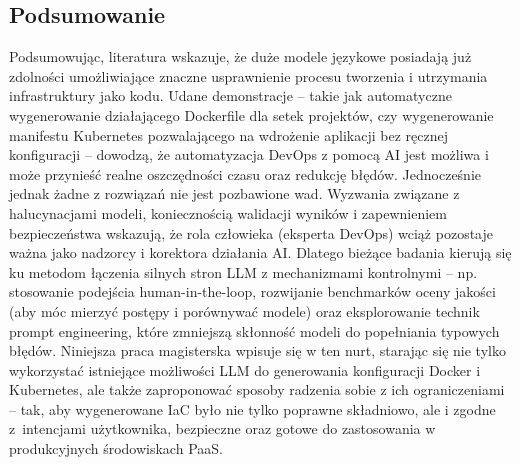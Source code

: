 \subsection{Podsumowanie}
Podsumowując, literatura wskazuje, że duże modele językowe posiadają już zdolności umożliwiające znaczne usprawnienie procesu tworzenia i utrzymania infrastruktury jako kodu. Udane demonstracje – takie jak automatyczne wygenerowanie działającego Dockerfile dla setek projektów, czy wygenerowanie manifestu Kubernetes pozwalającego na wdrożenie aplikacji bez ręcznej konfiguracji – dowodzą, że automatyzacja DevOps z pomocą AI jest możliwa i może przynieść realne oszczędności czasu oraz redukcję błędów. Jednocześnie jednak żadne z rozwiązań nie jest pozbawione wad. Wyzwania związane z halucynacjami modeli, koniecznością walidacji wyników i zapewnieniem bezpieczeństwa wskazują, że rola człowieka (eksperta DevOps) wciąż pozostaje ważna jako nadzorcy i korektora działania AI. Dlatego bieżące badania kierują się ku metodom łączenia silnych stron LLM z mechanizmami kontrolnymi – np. stosowanie podejścia human-in-the-loop, rozwijanie benchmarków oceny jakości (aby móc mierzyć postępy i porównywać modele) oraz eksplorowanie technik prompt engineering, które zmniejszą skłonność modeli do popełniania typowych błędów. Niniejsza praca magisterska wpisuje się w ten nurt, starając się nie tylko wykorzystać istniejące możliwości LLM do generowania konfiguracji Docker i Kubernetes, ale także zaproponować sposoby radzenia sobie z ich ograniczeniami – tak, aby wygenerowane IaC było nie tylko poprawne składniowo, ale i zgodne z intencjami użytkownika, bezpieczne oraz gotowe do zastosowania w produkcyjnych środowiskach PaaS.